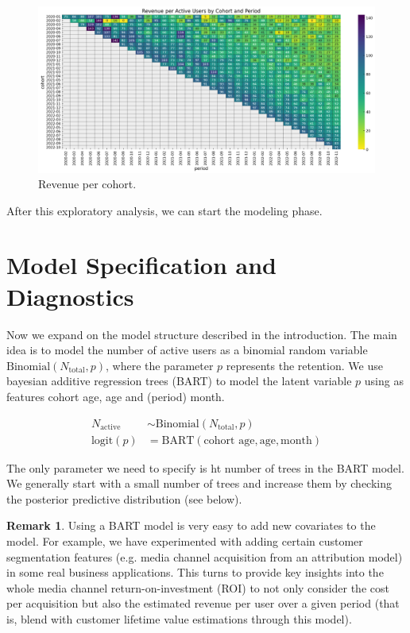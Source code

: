 \documentclass[11pt]{amsart}
\theoremstyle{definition}
\newtheorem{remark}{Remark}
\begin{document}
\begin{figure}
    \centering
    \includegraphics[width=\textwidth]{images/revenue_retention_25_0.png}
    \caption{Revenue per cohort.}
    \label{fig:revenue_per_active_user}
\end{figure}

After this exploratory analysis, we can start the modeling phase.

\section{Model Specification and Diagnostics}

Now we expand on the model structure described in the introduction. The main idea is to
model the number of active users as a binomial random variable
$\text{Binomial}(N_{\text{total}}, p)$, where the parameter $p$ represents the retention.
We use bayesian additive regression trees (BART) to model the latent variable $p$ using
as features cohort age, age and (period) month. 

\begin{align*}
    N_{\text{active}} & \sim \text{Binomial}(N_{\text{total}}, p) \\
    \textrm{logit}(p) & = \text{BART}(\text{cohort age}, \text{age}, \text{month})
\end{align*}

The only parameter we need to specify is ht number of trees in the BART model. We
generally start with a small number of trees and increase them by checking the posterior
predictive distribution (see below).

\begin{remark}
Using a BART model is very easy to add new covariates to the model. For example, we have
experimented with adding certain customer segmentation features (e.g. media channel
acquisition from an attribution model) in some real business applications. This turns to
provide key insights into the whole media channel return-on-investment (ROI) to not only
consider the cost per acquisition but also the estimated revenue per user over a given
period (that is, blend with customer lifetime value estimations through this model).
\end{remark}
\end{document}
